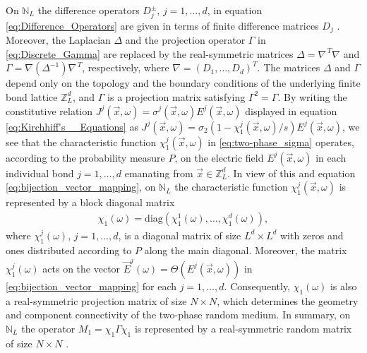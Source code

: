 \documentclass{cmslatex}
\begin{document}
On $\mathbb{N}_L$ the difference operators $D_j^\pm$, $j=1,\ldots,d$, in
equation \eqref{eq:Difference_Operators} are given in terms of finite 
difference matrices $D_j$
\cite{Demmel:1997}. Moreover, the Laplacian $\Delta$ and
the projection operator $\Gamma$ in \eqref{eq:Discrete_Gamma} are replaced 
by the real-symmetric matrices $\Delta=\nabla^{\,T}\nabla$ and $\Gamma=\nabla(\Delta^{-1})\nabla^{\,T}$,
respectively, where $\nabla=(D_1,\ldots,D_d)^T$. The matrices $\Delta$ and $\Gamma$
depend only on the topology and the boundary conditions 
of the underlying finite bond lattice $\mathbb{Z}_L^d$, and $\Gamma$ is a
projection matrix satisfying $\Gamma^2=\Gamma$. By writing the constitutive
relation $J^j(\vec{x},\omega)=\sigma^j(\vec{x},\omega)E^j(\vec{x},\omega)$ displayed in
equation \eqref{eq:Kirchhiff's__Equations} as
$J^j(\vec{x},\omega)=\sigma_2(1-\chi_1^j(\vec{x},\omega)/s)E^j(\vec{x},\omega)$, 
we see that the characteristic
function $\chi_1^j(\vec{x},\omega)$ in \eqref{eq:two-phase_sigma} operates,
according to the probability measure $P$, on the electric field
$E^j(\vec{x},\omega)$ in each individual bond $j=1,\ldots,d$ emanating from
$\vec{x}\in\mathbb{Z}_L^d$. In view of this and equation
\eqref{eq:bijection_vector_mapping}, on
$\mathbb{N}_L$ the characteristic function $\chi_1^j(\vec{x},\omega)$ is
represented by a block diagonal matrix 
%
\begin{align}\label{eq:block_diag_chi}  
  \chi_1(\omega)=\text{diag}(\chi_1^1(\omega),\ldots,\chi_1^d(\omega)),
\end{align}
%
where $\chi_1^j(\omega)$, $j=1,\ldots,d$, is a diagonal matrix of size $L^d\times L^d$ with
zeros and ones distributed according to $P$ along the main
diagonal. Moreover, the matrix $\chi_1^j(\omega)$ acts on the vector
$\vec{E}^j(\omega)=\Theta(E^j(\vec{x},\omega))$ in
\eqref{eq:bijection_vector_mapping} for each $j=1,\ldots,d$. Consequently, 
$\chi_1(\omega)$ is also a real-symmetric projection matrix of size $N\times N$,
which determines the geometry and component connectivity of the
two-phase random medium. In summary, on $\mathbb{N}_L$ the operator
$M_1=\chi_1\Gamma\chi_1$ is represented by a real-symmetric random matrix of size
$N\times N$ \cite{Golden:J_Biomech:337,Murphy:JMP:063506}.
\end{document}
